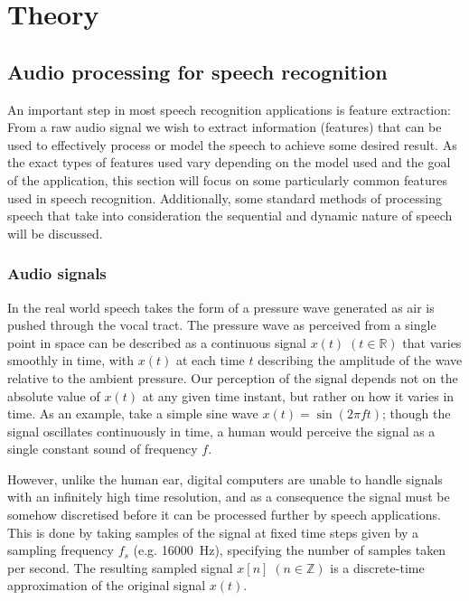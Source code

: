  
\chapter{Theory}

\section{Audio processing for speech recognition}

An important step in most speech recognition applications is feature extraction: From a raw audio signal we wish to extract information (features) that can be used to effectively process or model the speech to achieve some desired result.
As the exact types of features used vary depending on the model used and the goal of the application, this section will focus on some particularly common features used in speech recognition.
Additionally, some standard methods of processing speech that take into consideration the sequential and dynamic nature of speech will be discussed.

\subsection{Audio signals}

In the real world speech takes the form of a pressure wave generated as air is pushed through the vocal tract.
The pressure wave as perceived from a single point in space can be described as a continuous signal $x(t)\; (t\in \mathbb{R})$ that varies smoothly in time, with $x(t)$ at each time $t$ describing the amplitude of the wave relative to the ambient pressure.
Our perception of the signal depends not on the absolute value of $x(t)$ at any given time instant, but rather on how it varies in time.
As an example, take a simple sine wave $x(t) = \sin(2\pi f t)$; though the signal oscillates continuously in time, a human would perceive the signal as a single constant sound of frequency $f$.

However, unlike the human ear, digital computers are unable to handle signals with an infinitely high time resolution, and as a consequence the signal must be somehow discretised before it can be processed further by speech applications.
This is done by taking samples of the signal at fixed time steps given by a sampling frequency $f_s$ (e.g. \SI{16000}{\Hz}), specifying the number of samples taken per second.
The resulting sampled signal $x[n]\; (n \in \mathbb{Z})$ is a discrete-time approximation of the original signal $x(t)$.

